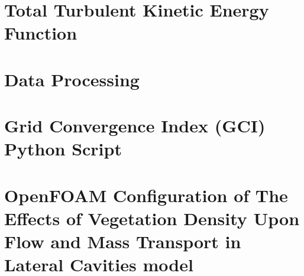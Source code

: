 \documentclass[a4paper,12pt]{report}
\begin{document}
\maketitle
\newpage









\tableofcontents
\listoffigures
\listoftables








\printbibliography[heading=bibintoc, title={References}]

\begin{appendices}
\chapter{Total Turbulent Kinetic Energy Function}
\label{chap:appendixA}


\chapter{Data Processing}
\label{chap:appendixB}


\chapter{Grid Convergence Index (GCI) Python Script}
\label{chap:appendixC}


\chapter{OpenFOAM Configuration of The Effects of Vegetation Density Upon Flow and Mass Transport in Lateral Cavities model}
\label{chap:appendixD}


\end{appendices}
\end{document}
